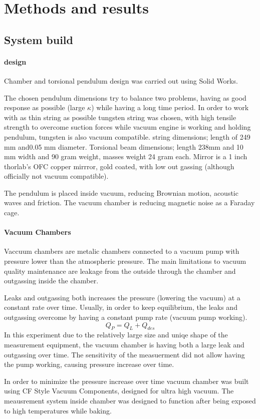 \documentclass[\main/master.tex]{subfiles}
\begin{document}
\chapter{Methods and results}\label{chp:example-2}
\section{System build}

\subsubsection{design}
Chamber and torsional pendulum design was carried out using Solid Works.

The chosen pendulum dimensions try to balance two problems, having as good response as possible (large $\kappa$) while having a long time period. In order to work with as thin string as possible tungsten string was chosen, with high tensile strength to overcome suction forces while vacuum engine is working and holding pendulum, tungsten is also vacuum compatible. string dimensions; length of 249 mm and0.05 mm diameter. Torsional beam dimensions; length 238mm and 10 mm width and 90 gram weight, masses weight 24 gram each. Mirror is a 1 inch thorlab’s OFC copper mirrror, gold coated, with low out gassing (although officially not vacuum compatible).

The pendulum is placed inside vacuum, reducing Brownian motion, acoustic waves and friction. The vacuum chamber is reducing magnetic noise as a Faraday cage.

\subsubsection{Vacuum Chambers}
Vaccuum chambers are metalic chambers connected to a vacuum pump with pressure lower than the atmospheric pressure. The main limitations to vacuum quality maintenance are leakage from the outside through the chamber and outgassing inside the chamber.
\par\noindent
Leaks and outgassing both increases the pressure (lowering the vacuum) at a constant rate over time. Usually, in order to keep equilibrium, the leaks and outgassing overcome by having a constant pump rate (vacuum pump working).   
\begin{equation}
Q_P = Q_L + Q_{des}  \label{eqn:vacuum_equilibrium}
\end{equation}
In this experiment due to the relatively large size and uniqe shape of the measurement equipment, the vacuum chamber is having both a large leak and outgassing over time. The sensitivity of the measuerment did not allow having the pump working, causing pressure increase over time.
\par\noindent 
In order to minimize the pressure increase over time vacuum chamber was built using CF Style Vacuum Components, designed for ultra high vacuum. The meausrement system inside chamber was designed to function after being exposed to high temperatures while baking.
\end{document}
